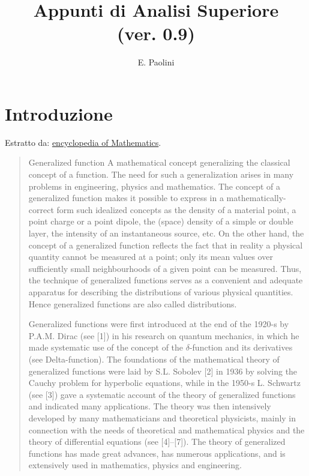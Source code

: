 \documentclass[italian,a4paper,oneside,headinclude]{scrbook}
\title{Appunti di Analisi Superiore\\(ver. 0.9)}
\author{E. Paolini}
\begin{document}
\maketitle

\tableofcontents

\chapter{Introduzione}

Estratto da: \href{https://www.encyclopediaofmath.org/index.php/Generalized_function}{encyclopedia of Mathematics}.

\begin{quote}
Generalized function
A mathematical concept generalizing the classical concept of a
function. The need for such a generalization arises in many problems
in engineering, physics and mathematics. The concept of a generalized
function makes it possible to express in a mathematically-correct form
such idealized concepts as the density of a material point, a point
charge or a point dipole, the (space) density of a simple or double
layer, the intensity of an instantaneous source, etc. On the other
hand, the concept of a generalized function reflects the fact that in
reality a physical quantity cannot be measured at a point; only its
mean values over sufficiently small neighbourhoods of a given point
can be measured. Thus, the technique of generalized functions serves
as a convenient and adequate apparatus for describing the
distributions of various physical quantities. Hence generalized
functions are also called distributions.

Generalized functions were first introduced at the end of the 1920-s
by P.A.M. Dirac (see [1]) in his research on quantum mechanics, in
which he made systematic use of the concept of the $\delta$-function and its
derivatives (see Delta-function). The foundations of the mathematical
theory of generalized functions were laid by S.L. Sobolev [2] in 1936
by solving the Cauchy problem for hyperbolic equations, while in the
1950-s L. Schwartz (see [3]) gave a systematic account of the theory
of generalized functions and indicated many applications. The theory
was then intensively developed by many mathematicians and theoretical
physicists, mainly in connection with the needs of theoretical and
mathematical physics and the theory of differential equations (see
[4]–[7]). The theory of generalized functions has made great advances,
has numerous applications, and is extensively used in mathematics,
physics and engineering.
\end{quote}
\end{document}

